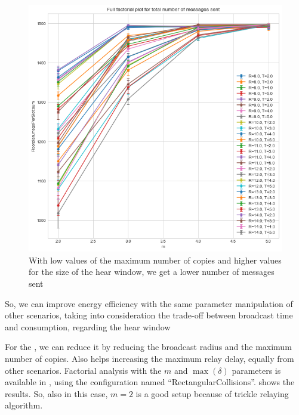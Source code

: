 \begin{figure}
	\centering
	\includegraphics[width=\textwidth]{img/rect/messages-m-ffplot.png}
	\caption{With low values of the maximum number of copies and higher
	values for the size of the hear window, we get a lower number of
	messages sent}\label{fig:rectmessagesff}
\end{figure}

So, we can improve energy efficiency with the same parameter manipulation of
other scenarios, taking into consideration the trade-off between broadcast time
and consumption, regarding the hear window

For the , we can reduce it by reducing the
broadcast radius and the maximum number of copies. Also helps increasing the
maximum relay delay, equally from other scenarios.  Factorial analysis with the
\(m\) and \(\max(\delta)\) parameters is available in ,
using the configuration named ``RectangularCollisions''.
 shows the results.  So, also in this case,
\(m\!=\!2\) is a good setup because of trickle relaying algorithm.

